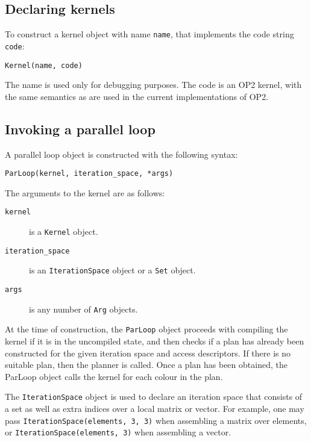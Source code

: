 \documentclass[a4paper]{article}
\begin{document}
\subsection{Declaring kernels}

To construct a kernel object with name \verb|name|, that implements the code string \verb|code|:

\begin{verbatim}
Kernel(name, code)
\end{verbatim}

The name is used only for debugging purposes. The code is an OP2 kernel, with the same semantics as are used in the current implementations of OP2.

\subsection{Invoking a parallel loop}

A parallel loop object is constructed with the following syntax:

\begin{verbatim}
ParLoop(kernel, iteration_space, *args)
\end{verbatim}

The arguments to the kernel are as follows:

\begin{description}
  \item[\texttt{kernel}] is a \verb|Kernel| object.
  \item[\texttt{iteration\_space}] is an \verb|IterationSpace| object or a \verb|Set| object.
  \item[\texttt{args}] is any number of \verb|Arg| objects.
\end{description}

At the time of construction, the \verb|ParLoop| object proceeds with compiling the kernel if it is in the uncompiled state, and then checks if a plan has already been constructed for the given iteration space and access descriptors. If there is no suitable plan, then the planner is called. Once a plan has been obtained, the ParLoop object calls the kernel for each colour in the plan.

The \verb|IterationSpace| object is used to declare an iteration space that consists of a set as well as extra indices over a local matrix or vector. For example, one may pass \verb|IterationSpace(elements, 3, 3)| when assembling a matrix over elements, or \verb|IterationSpace(elements, 3)| when assembling a vector.
\end{document}

